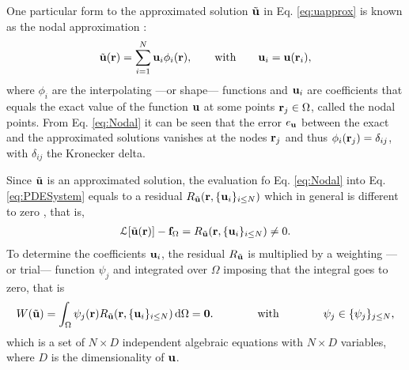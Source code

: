          One particular form to the approximated solution $\tilde{\vb{u}}$ in Eq. \eqref{eq:uapprox} is known as the nodal approximation \cite{dhatt_finite_2012, fletcher_computational_1984}:
        \begin{align}
            \tilde{\vb{u}}(\vb{r}) = \sum_{i = 1}^N \vb{u}_i \phi_i(\vb{r}),
                \qquad
                \text{with}
                \qquad
            \vb{u}_i = \vb{u}(\vb{r}_i),
        \label{eq:Nodal}
        \end{align}
        where  $\phi_i$ are the interpolating ---or shape--- functions and $\vb{u}_i$ are coefficients that equals the exact value of the function $\vb{u}$ at some points $\vb{r}_j \in \Omega$, called the nodal points. From Eq. \eqref{eq:Nodal} it can be seen that the error $e_{\vb{u}}$ between the exact and the approximated solutions vanishes at the nodes $\vb{r}_j$ and thus $\phi_i(\vb{r}_j) = \delta_{ij}$, with $\delta_{ij}$ the Kronecker delta.

         Since $\tilde{\vb{u}}$ is an approximated solution, the evaluation fo Eq. \eqref{eq:Nodal} into Eq. \eqref{eq:PDESystem} equals to a residual $  R_{\tilde{\vb{u}}}(\vb{r},\{\vb{u}_i\}_{i\leq N}) $ which in general is different to zero \cite{fletcher_computational_1984,larson_finite_2013}, that is,
        \begin{align}
            \mathcal{L}[\tilde{\vb{u}}(\vb{r})] - \vb{f}_\Omega = R_{\tilde{\vb{u}}}(\vb{r},\{\vb{u}_i\}_{i\leq N}) \neq 0.
        \label{eq:PDESystem-app}
        \end{align}
        To determine the coefficients $\vb{u}_i$, the residual $R_{\tilde{\vb{u}}}$ is multiplied by a weighting ---or trial--- function $\psi_j$ and integrated over $\Omega$ imposing that the integral goes to zero, that is
        \begin{align}
            W(\tilde{\vb{u}}) = \int_\Omega \psi_j(\vb{r}) R_{\tilde{\vb{u}}}(\vb{r},\{\vb{u}_i\}_{i\leq N}) \dd{\Omega} = \vb{0}.
                \qquad\qquad
                \text{with}
                \qquad\qquad
                \psi_j \in \{\psi_j\}_{j\leq N},
            \label{eq:WRM}
        \end{align}
        which is a set of $N\times D$ independent algebraic equations with $N\times D$ variables, where $D$ is the dimensionality of $\vb{u}$.

